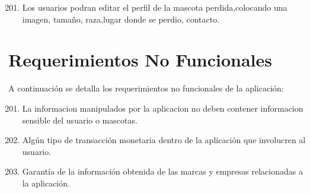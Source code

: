 \begin{flushright}
	
	\begin{enumerate} [label=RF-\arabic*. , align=left]
		\setcounter{enumi}{200}	 %
		\item Los usuarios podran editar el perfil de la mascota perdida,colocando una imagen, tamaño, raza,lugar donde se perdio, contacto.
		
	\end{enumerate}
	
\end{flushright}


\section{Requerimientos No Funcionales}
A continuación se detalla los requerimientos no funcionales de la aplicación:
\begin{flushright}
	
	\begin{enumerate} [label=RF-\arabic*. , align=left]
		\setcounter{enumi}{200}	 %
		\item La informacion manipulados por la aplicacion no deben contener informacion sensible del usuario o mascotas.
	  
		\item Algún tipo de transacción monetaria dentro de la aplicación que involucren al usuario.
		 
		\item Garantía de la información obtenida de las marcas y empresas relacionadas a la aplicación.
		 
		
	\end{enumerate}
	
\end{flushright}



